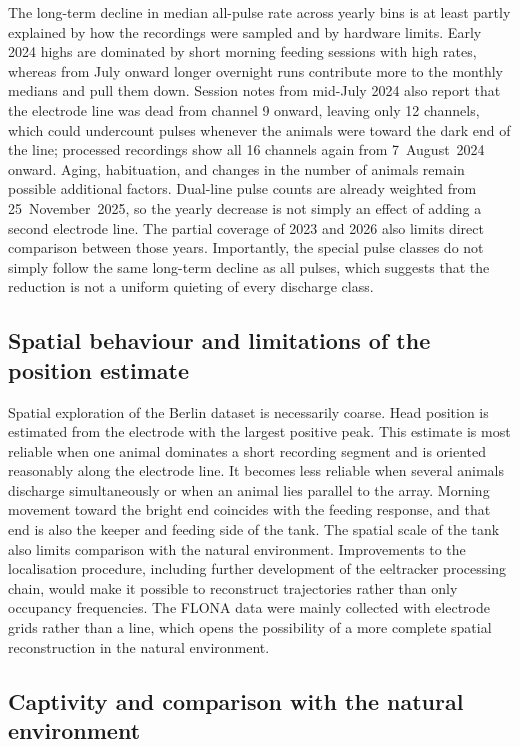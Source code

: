 The long-term decline in median all-pulse rate across yearly bins is at least partly explained by how the recordings were sampled and by hardware limits.
Early 2024 highs are dominated by short morning feeding sessions with high rates, whereas from July onward longer overnight runs contribute more to the monthly medians and pull them down.
Session notes from mid-July 2024 also report that the electrode line was dead from channel 9 onward, leaving only 12 channels, which could undercount pulses whenever the animals were toward the dark end of the line; processed recordings show all 16 channels again from 7~August~2024 onward.
Aging, habituation, and changes in the number of animals remain possible additional factors.
Dual-line pulse counts are already weighted from 25~November~2025, so the yearly decrease is not simply an effect of adding a second electrode line. 
The partial coverage of 2023 and 2026 also limits direct comparison between those years.
Importantly, the special pulse classes do not simply follow the same long-term decline as all pulses, which suggests that the reduction is not a uniform quieting of every discharge class.

\subsection{Spatial behaviour and limitations of the position estimate}

Spatial exploration of the Berlin dataset is necessarily coarse. 
Head position is estimated from the electrode with the largest positive peak.
This estimate is most reliable when one animal dominates a short recording segment and is oriented reasonably along the electrode line. 
It becomes less reliable when several animals discharge simultaneously or when an animal lies parallel to the array.
Morning movement toward the bright end coincides with the feeding response, and that end is also the keeper and feeding side of the tank.
The spatial scale of the tank also limits comparison with the natural environment. 
Improvements to the localisation procedure, including further development of the eeltracker processing chain, would make it possible to reconstruct trajectories rather than only occupancy frequencies. 
The FLONA data were mainly collected with electrode grids rather than a line, which opens the possibility of a more complete spatial reconstruction in the natural environment.

\subsection{Captivity and comparison with the natural environment}

